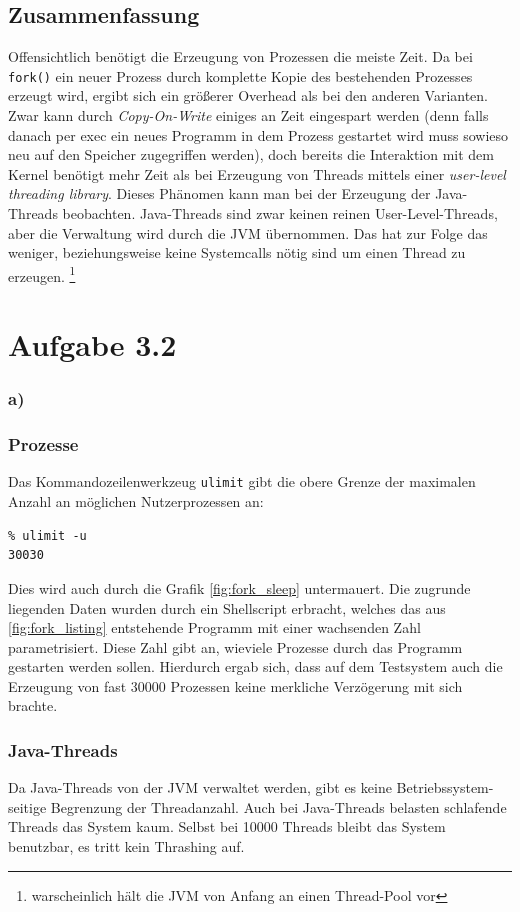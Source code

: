 \documentclass[a4paper,
12pt,
BCOR12mm,
]{scrartcl}
\begin{document}
\subsection*{Zusammenfassung}
Offensichtlich benötigt die Erzeugung von Prozessen die meiste Zeit. Da bei
\verb|fork()| ein neuer Prozess durch komplette Kopie des bestehenden Prozesses
erzeugt wird, ergibt sich ein größerer Overhead als bei den anderen Varianten. Zwar
kann durch \emph{Copy-On-Write} einiges an Zeit eingespart werden (denn falls danach per
exec ein neues Programm in dem Prozess gestartet wird muss sowieso neu auf den Speicher
zugegriffen werden), doch bereits die Interaktion mit dem Kernel benötigt mehr Zeit als
bei Erzeugung von Threads mittels einer \emph{user-level threading library}.
Dieses Phänomen kann man bei der Erzeugung der Java-Threads beobachten. Java-Threads sind
zwar keinen reinen User-Level-Threads, aber die Verwaltung wird durch die JVM übernommen.
Das hat zur Folge das weniger, beziehungsweise keine Systemcalls nötig sind um einen
Thread zu erzeugen. \footnote{warscheinlich hält die JVM von Anfang an einen Thread-Pool vor}

\section*{Aufgabe 3.2} 
\subsubsection*{a)}
\subsubsection*{Prozesse} 
Das Kommandozeilenwerkzeug \verb|ulimit| gibt die obere Grenze der maximalen Anzahl an
möglichen Nutzerprozessen an:
\begin{verbatim} 
% ulimit -u
30030
\end{verbatim}
Dies wird auch durch die Grafik \ref{fig:fork_sleep} untermauert. Die zugrunde liegenden
Daten wurden durch ein Shellscript erbracht, welches das aus \ref{fig:fork_listing}
entstehende Programm mit einer wachsenden Zahl parametrisiert. Diese Zahl gibt an,
wieviele Prozesse durch das Programm gestarten werden sollen. Hierdurch ergab sich, dass
auf dem Testsystem auch die Erzeugung von fast $30000$ Prozessen keine merkliche
Verzögerung mit sich brachte.

\subsubsection*{Java-Threads}
Da Java-Threads von der JVM verwaltet werden, gibt es keine Betriebssystem-seitige Begrenzung der Threadanzahl.
Auch bei Java-Threads belasten schlafende Threads das System kaum. Selbst bei 10000 Threads bleibt
das System benutzbar, es tritt kein Thrashing auf.
\end{document}
